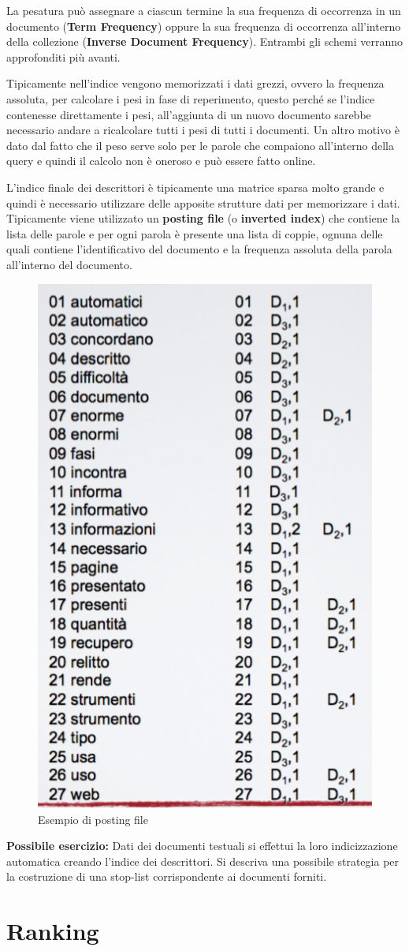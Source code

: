 La pesatura può assegnare a ciascun termine la sua frequenza di occorrenza in un documento (\textbf{Term Frequency}) oppure la sua frequenza di occorrenza all'interno della collezione (\textbf{Inverse Document Frequency}). Entrambi gli schemi verranno approfonditi più avanti.

Tipicamente nell'indice vengono memorizzati i dati grezzi, ovvero la frequenza assoluta, per calcolare i pesi in fase di reperimento, questo perché se l'indice contenesse direttamente i pesi, all'aggiunta di un nuovo documento sarebbe necessario andare a ricalcolare tutti i pesi di tutti i documenti. Un altro motivo è dato dal fatto che il peso serve solo per le parole che compaiono all'interno della query e quindi il calcolo non è oneroso e può essere fatto online.

L'indice finale dei descrittori è tipicamente una matrice sparsa molto grande e quindi è necessario utilizzare delle apposite strutture dati per memorizzare i dati.
Tipicamente viene utilizzato un \textbf{posting file} (o \textbf{inverted index}) che contiene la lista delle parole e per ogni parola è presente una lista di coppie, ognuna delle quali contiene l'identificativo del documento e la frequenza assoluta della parola all'interno del documento.

\begin{figure}[htbp]
	\centering
	\includegraphics[width=0.3\linewidth]{images/l5-index-4}
	\caption{Esempio di posting file}
\end{figure}

\textbf{{\color{Red} Possibile esercizio:}} Dati dei documenti testuali si effettui la loro indicizzazione automatica creando l'indice dei descrittori. Si descriva una possibile strategia per la costruzione di una stop-list corrispondente ai documenti forniti.

\section{Ranking}

